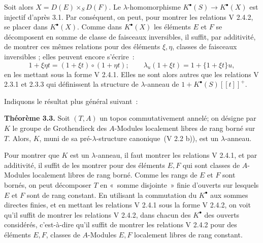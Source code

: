 Soit alors \(X=D(E)\times_S D(F)\). Le \(\lambda\)-homomorphisme \(K^{\bullet}(S)\to K^{\bullet}(X)\) est injectif d'après 3.1. Par conséquent, on peut, pour montrer les relations V 2.4.2, se placer dans \(K^{\bullet}(X)\). Comme dans \(K^{\bullet}(X)\) les éléments \(E\) et \(F\) se décomposent en somme de classe de faisceaux inversibles, il suffit, par additivité, de montrer ces mêmes relations pour des éléments \(\xi,\eta\), classes de faisceaux inversibles ; elles peuvent encore s'écrire~:
\[
  1+\xi\eta t=(1+\xi t)\circ(1+\eta t);
  \qquad
  \lambda_u(1+\xi t)=1+\{1+\xi t\}u,
\]
en les mettant sous la forme V 2.4.1. Elles ne sont alors autres que les relations V 2.3.1 et 2.3.3 qui définissent la structure de \(\lambda\)-anneau de \(1+K^{\bullet}(S)[[t]]^+\).

Indiquons le résultat plus général suivant~:

\textbf{Théorème 3.3.} Soit \((T,A)\) un topos commutativement annelé; on désigne par \(K\) le groupe de Grothendieck des \(A\)-Modules localement libres de rang borné sur \(T\). Alors, \(K\), muni de sa pré-\(\lambda\)-structure canonique~(V 2.2 b)), est un \(\lambda\)-anneau.

Pour montrer que \(K\) est un \(\lambda\)-anneau, il faut montrer les relations V 2.4.1, et par additivité, il suffit de les montrer pour des éléments \(E,F\) qui sont classes de \(A\)-Modules localement libres de rang borné. Comme les rangs de \(E\) et \(F\) sont bornés, on peut décomposer \(T\) en «~somme disjointe~» finie d'ouverts sur lesquels \(E\) et \(F\) sont de rang constant. En utilisant la commutation du \(K^{\bullet}\) aux sommes directes finies, et en mettant les relations V 2.4.1 sous la forme V 2.4.2, on voit qu'il suffit de montrer les relations V 2.4.2, dans chacun des \(K^{\bullet}\) des ouverts considérés, c'est-à-dire qu'il suffit de montrer les relations V 2.4.2 pour des éléments \(E,F\), classes de \(A\)-Modules \(E,F\) localement libres de rang constant.

